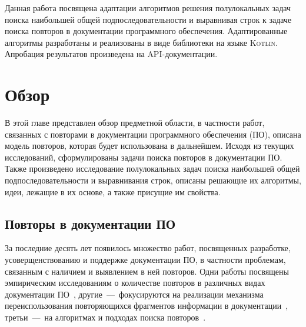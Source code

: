 Данная работа посвящена адаптации алгоритмов решения полулокальных задач поиска наибольшей общей подпоследовательности и выравнивая строк к задаче поиска повторов в документации программного обеспечения.
Адаптированные алгоритмы разработаны и реализованы в виде библиотеки на языке \textsc{Kotlin}.
Апробация результатов произведена на {API}-документации.


\section{Обзор}
\label{sec:overview}
В этой главе представлен обзор предметной области, в частности работ, связанных с повторами в документации программного обеспечения (ПО), описана модель повторов, которая будет использована в дальнейшем. 
Исходя из текущих исследований, сформулированы задачи поиска повторов в документации ПО.
Также произведено исследование полулокальных задач поиска наибольшей общей подпоследовательности и выравнивания строк, описаны решающие их алгоритмы, %
идеи, лежащие в их основе, а также присущие им свойства.

\subsection{Повторы в документации ПО}\label{duplicateReport}

За последние десять лет появилось множество работ, посвященных разработке, усоверщенствованию и поддержке документации ПО, в частности проблемам, связанным с наличием и выявлением в ней повторов.
Одни работы посвящены эмпирическим исследованиям о количестве повторов  в различных видах документации ПО~\cite{poruban2016preliminary,juergens2010can,oumaziz2017documentation}, другие~---~фокусируются на реализации механизма переиспользования повторяющихся фрагментов информации в документации~\cite{koznov2015clone,horie2010tool,poruban2014reusable}, третьи~---~на алгоритмах и подходах поиска повторов~\cite{luciv2018detecting,luciv2019interactive,blasi2018replicomment,rago2016identifying, soto2015similarity}.

